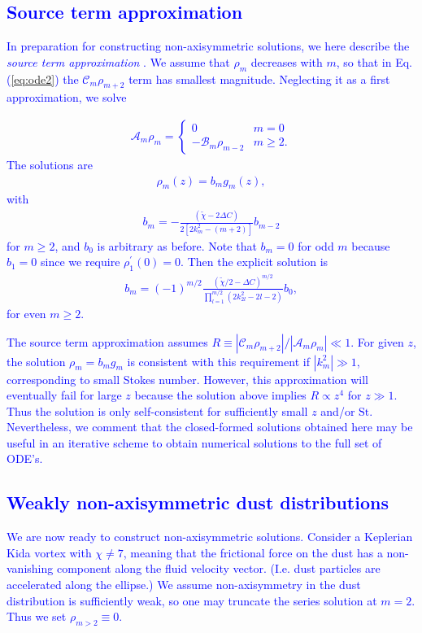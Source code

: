 \documentclass[apj]{emulateapj}
\def\blue#1{\textcolor{blue}{#1}}
\newcommand{\Eq}[1]{Eq. (\ref{#1})}
\newcommand{\eq}[1]{\Eq{#1}}
\begin{document}
\blue{
\subsection{Source term approximation}
In preparation for constructing non-axisymmetric solutions, we here describe the \emph{source term approximation} \citep{Zhang06}.
We assume that $\rho_m$ decreases with $m$, so that in \eq{eq:ode2} the $\mathcal{C}_m\rho_{m+2}$ term has smallest magnitude.  Neglecting it as a first approximation, we solve 
}
\blue{
\begin{align}
\mathcal{A}_m\rho_m = \begin{cases}
        0 & m =0 \\
	-\mathcal{B}_m\rho_{m-2} & m \geq 2.
\end{cases}
\end{align}
The solutions are 
\begin{align}\label{eq:series1}
\rho_m (z)= b_m g_m(z),
\end{align}
with
\begin{align}
b_m  = -\frac{\left(\tilde{\chi} - 2\Delta C\right)}{2\left[2k_m^2 - (m+2)\right]}b_{m-2}
\end{align}
for $m\geq2$, and $b_0$ is arbitrary as before. Note that $b_m=0$ for odd $m$ because $b_1=0$ since 
we require $\rho_1^\prime(0)=0$. Then the explicit solution is 
\begin{align}\label{eq:induction}
b_m  = \left(-1\right)^{m/2}\frac{\left(\tilde{\chi}/2-\Delta C\right)^{m/2}}{\prod_{l=1}^{m/2}
\left(2k_{2l}^2 -2l - 2\right)}b_0,
\end{align}
for even $m\geq 2$.  
}

\blue{
The source term approximation assumes 
$R\equiv|\mathcal{C}_m\rho_{m+2}|/|\mathcal{A}_m\rho_m| \ll 1.$ 
For given $z$, the solution $\rho_m=b_mg_m$ is consistent with this requirement if $|k_m^2|\gg1$, corresponding to small Stokes number.  
 However, this approximation will eventually fail for large $z$ because the solution above implies $R\propto z^4$ for $z\gg1$. Thus the solution is only self-consistent for sufficiently small $z$ and/or $\mathrm{St}$. Nevertheless,
we comment that the closed-formed solutions obtained here may be useful in
an iterative scheme to obtain numerical solutions to the full set of ODE's. 
}

\blue{
\subsection{Weakly non-axisymmetric dust distributions}
We are now ready to construct non-axisymmetric solutions. 
Consider a Keplerian Kida vortex with $\chi\neq 7$, meaning that the frictional force on the dust has a non-vanishing component along the fluid velocity vector. (I.e. dust particles are accelerated along the ellipse.) We assume non-axisymmetry in the dust distribution is sufficiently weak, so one may truncate the series solution at $m=2$. Thus we set $\rho_{m>2}\equiv0$. 
}
\end{document}
